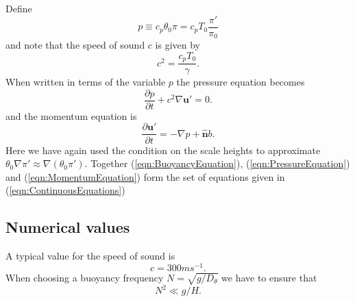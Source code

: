 \documentclass[10pt]{article}
\renewcommand{\vec}[1]{\boldsymbol{#1}}
\begin{document}
Define
\begin{equation}
  p \equiv c_p \theta_0 \pi = c_p T_0 \frac{\pi'}{\pi_0}
\end{equation}
and note that the speed of sound $c$ is given by
\begin{equation}
  c^2 = \frac{c_p T_0}{\gamma}.
\end{equation}
When written in terms of the variable $p$ the pressure equation becomes
\begin{equation}
  \frac{\partial p}{\partial t} + c^2 \nabla\vec{u}' = 0.
  \label{eqn:PressureEquation}
\end{equation}
and the momentum equation is
\begin{equation}
  \frac{\partial \vec{u}'}{\partial t} = -\nabla p+\hat{\vec{n}}b.
  \label{eqn:MomentumEquation}
\end{equation}
Here we have again used the condition on the scale heights to approximate
$\theta_0\nabla \pi' \approx \nabla(\theta_0\pi')$.
Together (\ref{eqn:BuoyancyEquation}), (\ref{eqn:PressureEquation}) and (\ref{eqn:MomentumEquation}) form the set of equations given in (\ref{eqn:ContinuousEquations}) 
\subsection{Numerical values}
A typical value for the speed of sound is
\begin{equation}
  c = 300ms^{-1}.
\end{equation}
When choosing a buoyancy frequency $N = \sqrt{g/D_\theta}$ we have to ensure that
\begin{equation}
  N^2 \ll g/H.
\end{equation}



\end{document}
